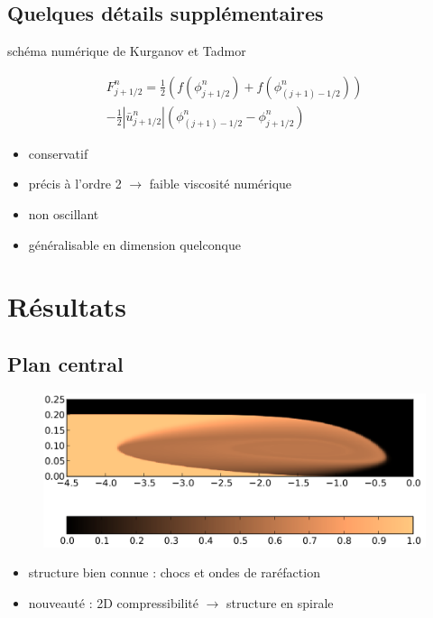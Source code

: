 \documentclass[xcolor=dvipsnames]{beamer}
\begin{document}
\subsection{Quelques détails supplémentaires}
\begin{frame}

schéma numérique de Kurganov et Tadmor

\[
\begin{split}
	F^n_{j+1/2} = \frac{1}{2} \left( f(\phi^n_{j+1/2}) + f(\phi^n_{(j+1)-1/2}) \right)  \\ - \frac{1}{2} | \bar{u}^n_{j+1/2} | \left( \phi^n_{(j+1)-1/2} - \phi^n_{j+1/2} \right)
\end{split}
\]

\begin{itemize}

\item conservatif

\item précis à l'ordre 2 $\rightarrow$ faible viscosité numérique 

\item non oscillant

\item généralisable en dimension quelconque

\end{itemize}

\end{frame}


\section{Résultats}
\subsection{Plan central}
\begin{frame}

\begin{figure}[htp]
\centering
\includegraphics[scale=0.60]{img/spiral.png}
\label{}
\end{figure}

\begin{itemize}
\item structure bien connue : chocs et ondes de raréfaction
\item nouveauté : 2D compressibilité  $\rightarrow$  structure en spirale 
\end{itemize}

\end{frame}
\end{document}
